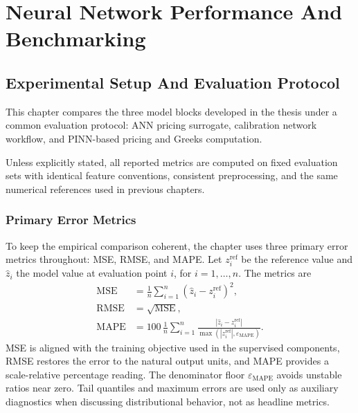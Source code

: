 \chapter{Neural Network Performance And Benchmarking}
\label{ch:performance_benchmarks}

\section{Experimental Setup And Evaluation Protocol}
\label{sec:benchmark_protocol}
This chapter compares the three model blocks developed in the thesis under a common evaluation protocol: ANN pricing surrogate, calibration network workflow, and PINN-based pricing and Greeks computation.

Unless explicitly stated, all reported metrics are computed on fixed evaluation sets with identical feature conventions, consistent preprocessing, and the same numerical references used in previous chapters.

\subsection{Primary Error Metrics}
\label{sec:benchmark_error_metrics}

To keep the empirical comparison coherent, the chapter uses three primary error metrics throughout: MSE, RMSE, and MAPE. Let \(z_i^{\mathrm{ref}}\) be the reference value and \(\hat z_i\) the model value at evaluation point \(i\), for \(i=1,\ldots,n\). The metrics are
\begin{equation}
    \begin{aligned}
    \mathrm{MSE}
        &=\frac{1}{n}\sum_{i=1}^{n}\left(\hat z_i-z_i^{\mathrm{ref}}\right)^2,\\
    \mathrm{RMSE}
        &=\sqrt{\mathrm{MSE}},\\
    \mathrm{MAPE}
        &=100\,\frac{1}{n}\sum_{i=1}^{n}
        \frac{\left|\hat z_i-z_i^{\mathrm{ref}}\right|}
        {\max\left(\left|z_i^{\mathrm{ref}}\right|,\varepsilon_{\mathrm{MAPE}}\right)}.
    \end{aligned}
\end{equation}
MSE is aligned with the training objective used in the supervised components, RMSE restores the error to the natural output units, and MAPE provides a scale-relative percentage reading. The denominator floor \(\varepsilon_{\mathrm{MAPE}}\) avoids unstable ratios near zero. Tail quantiles and maximum errors are used only as auxiliary diagnostics when discussing distributional behavior, not as headline metrics.


